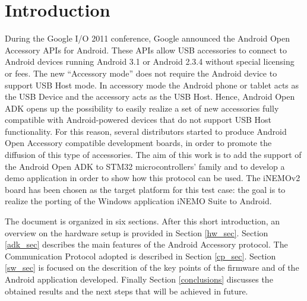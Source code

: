 \section{Introduction}
\label{intro}

During the Google I/O 2011 conference, Google announced the Android Open Accessory APIs for Android. These APIs allow USB accessories to connect to Android devices running Android 3.1 or Android 2.3.4 without special licensing or fees. The new ``Accessory mode'' does not require the Android device to support USB Host mode. In accessory mode the Android phone or tablet acts as the USB Device and the accessory acts as the USB Host. Hence, Android Open ADK opens up the possibility to easily realize a set of new accessories fully compatible with Android-powered devices that do not support USB Host functionality. For this reason, several distributors started to produce Android Open Accessory compatible development boards, in order to promote the diffusion of this type of accessories. The aim of this work is to add the support of the Android Open ADK to STM32 microcontrollers' family and to develop a demo application in order to show how this protocol can be used. The iNEMOv2 board has been chosen as the target platform for this test case: the goal is to realize the porting of the Windows application iNEMO Suite to Android.

The document is organized in six sections. After this short introduction, an overview on the hardware setup is provided in Section \ref{hw_sec}. Section \ref{adk_sec} describes the main features of the Android Accessory protocol. The Communication Protocol adopted is described in Section \ref{cp_sec}. Section \ref{sw_sec} is focused on the descrition of the key points of the firmware and of the Android application developed. Finally Section \ref{conclusions} discusses the obtained results and the next steps that will be achieved in future.
